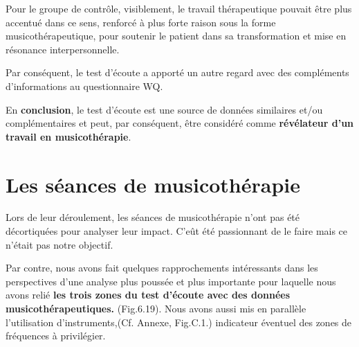               Pour le groupe de contrôle, visiblement, le travail
                thérapeutique pouvait être plus accentué dans ce
                sens, renforcé à plus forte raison sous la forme musicothérapeutique, pour soutenir le
                patient dans sa transformation et mise en résonance
                interpersonnelle.

                
                Par conséquent,  le test d'écoute a
                apporté un autre regard avec des compléments d'informations au questionnaire
                WQ.

                En\textbf{ conclusion}, le test
                d'écoute est une source de données similaires
                et/ou complémentaires et peut, par conséquent, être
                considéré comme \textbf{révélateur d'un
                travail en musicothérapie}.

 \section{Les séances de musicothérapie}
               Lors de leur déroulement, les séances de
               musicothérapie n'ont pas été 
décortiquées pour analyser leur impact. C'eût
été passionnant de le faire mais ce n'était pas notre objectif.


Par contre, nous avons fait quelques rapprochements intéressants dans les perspectives d'une analyse plus
poussée et plus importante pour laquelle nous avons  relié\textbf{ les trois zones du
test d'écoute avec des données musicothérapeutiques.}
(Fig.6.19).
Nous avons aussi mis 
en parallèle  l'utilisation d'instruments,(Cf. Annexe, Fig.C.1.)
indicateur éventuel des zones de fréquences à
privilégier.





